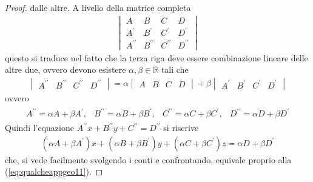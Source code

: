 \begin{proof}
  dalle altre. A livello della matrice completa
  \begin{eqnarray*}
    \begin{vmatrix}
      A & B & C & D\\
      A^\prime & B^\prime & C^\prime & D^\prime\\
      A^{\prime\prime} & B^{\prime\prime} & C^{\prime\prime} & D^{\prime\prime}
    \end{vmatrix}
  \end{eqnarray*}
  questo si traduce nel fatto che la terza riga deve essere combinazione lineare delle altre due,
  ovvero devono esistere $\alpha,\beta\in\mathds{R}$ tali che
  \begin{eqnarray*}
    \begin{vmatrix}
      A^{\prime\prime} & B^{\prime\prime} & C^{\prime\prime} & D^{\prime\prime}
    \end{vmatrix}=\alpha
    \begin{vmatrix}
      A & B & C & D
    \end{vmatrix} +\beta
    \begin{vmatrix}
      A^\prime & B^\prime & C^\prime & D^\prime
    \end{vmatrix}
  \end{eqnarray*}
  ovvero
  \begin{eqnarray*}
    \begin{matrix}
      A^{\prime\prime}=\alpha A +\beta A^\prime, & B^{\prime\prime}=\alpha B+\beta B^\prime,
      & C^{\prime\prime} =\alpha C + \beta C^\prime, & D^{\prime\prime}=\alpha D+\beta D^\prime
    \end{matrix}
  \end{eqnarray*}
  Quindi l'equazione $A^{\prime\prime}x+B^{\prime\prime}y+C^{\prime\prime}=D^{\prime\prime}$ si riscrive
  \begin{eqnarray*}
    (\alpha A+\beta A^\prime)x+(\alpha B+\beta B^\prime)y+(\alpha C+\beta C^\prime)z=\alpha D + \beta
    D^\prime
  \end{eqnarray*}
  che, si vede facilmente svolgendo i conti e confrontando, equivale proprio alla
  (\ref{eq:qualcheappgeo11}).
\end{proof}
